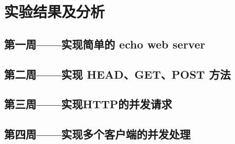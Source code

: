 \chapter{实验结果及分析}


\section{第一周——实现简单的 echo web server}

\section{第二周——实现 HEAD、GET、POST 方法}

\section{第三周——实现HTTP的并发请求}

\section{第四周——实现多个客户端的并发处理}


